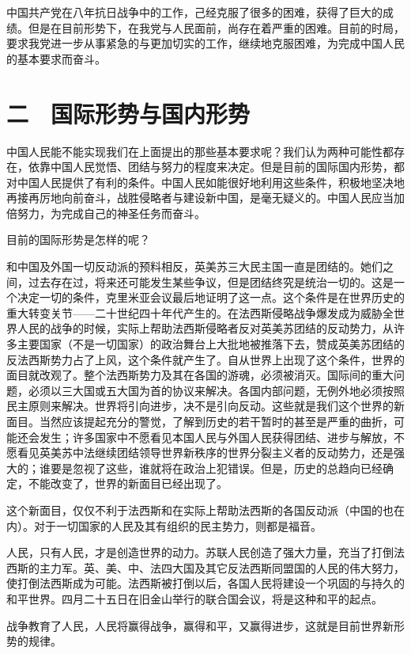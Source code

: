中国共产党在八年抗日战争中的工作，己经克服了很多的困难，获得了巨大的成绩。但是在目前形势下，在我党与人民面前，尚存在着严重的困难。目前的时局，要求我党进一步从事紧急的与更加切实的工作，继续地克服困难，为完成中国人民的基本要求而奋斗。

\section{二　国际形势与国内形势}

中国人民能不能实现我们在上面提出的那些基本要求呢？我们认为两种可能性都存在，依靠中国人民觉悟、团结与努力的程度来决定。但是目前的国际国内形势，都对中国人民提供了有利的条件。中国人民如能很好地利用这些条件，积极地坚决地再接再厉地向前奋斗，战胜侵略者与建设新中国，是毫无疑义的。中国人民应当加倍努力，为完成自己的神圣任务而奋斗。

目前的国际形势是怎样的呢？

和中国及外国一切反动派的预料相反，英美苏三大民主国一直是团结的。她们之间，过去存在过，将来还可能发生某些争议，但是团结终究是统治一切的。这是一个决定一切的条件，克里米亚会议最后地证明了这一点。这个条件是在世界历史的重大转变关节——二十世纪四十年代产生的。在法西斯侵略战争爆发成为威胁全世界人民的战争的时候，实际上帮助法西斯侵略者反对英美苏团结的反动势力，从许多主要国家（不是一切国家）的政治舞台上大批地被推落下去，赞成英美苏团结的反法西斯势力占了上风，这个条件就产生了。自从世界上出现了这个条件，世界的面目就改观了。整个法西斯势力及其在各国的游魂，必须被消灭。国际间的重大问题，必须以三大国或五大国为首的协议来解决。各国内部问题，无例外地必须按照民主原则来解决。世界将引向进步，决不是引向反动。这些就是我们这个世界的新面目。当然应该提起充分的警觉，了解到历史的若干暂时的甚至是严重的曲折，可能还会发生；许多国家中不愿看见本国人民与外国人民获得团结、进步与解放，不愿看见英美苏中法继续团结领导世界新秩序的世界分裂主义者的反动势力，还是强大的；谁要是忽视了这些，谁就将在政治上犯错误。但是，历史的总趋向已经确定，不能改变了，世界的新面目已经出现了。

这个新面目，仅仅不利于法西斯和在实际上帮助法西斯的各国反动派（中国的也在内）。对于一切国家的人民及其有组织的民主势力，则都是福音。

人民，只有人民，才是创造世界的动力。苏联人民创造了强大力量，充当了打倒法西斯的主力军。英、美、中、法四大国及其它反法西斯同盟国的人民的伟大努力，使打倒法西斯成为可能。法西斯被打倒以后，各国人民将建设一个巩固的与持久的和平世界。四月二十五日在旧金山举行的联合国会议，将是这种和平的起点。

战争教育了人民，人民将赢得战争，赢得和平，又赢得进步，这就是目前世界新形势的规律。

